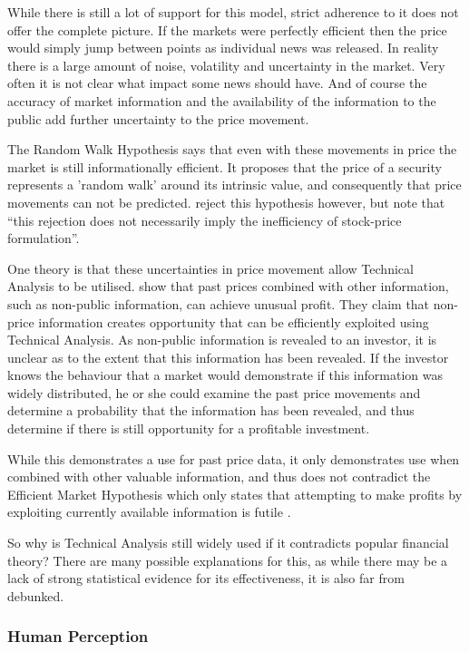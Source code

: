 \documentclass{article}
\theoremstyle{definition}
\begin{document}
While there is still a lot of support for this model, strict adherence to it does not offer the complete picture. If the markets were perfectly efficient then the price would simply jump between points as individual news was released. In reality there is a large amount of noise, volatility and uncertainty in the market. Very often it is not clear what impact some news should have. And of course the accuracy of market information and the availability of the information to the public add further uncertainty to the price movement.

The Random Walk Hypothesis says that even with these movements in price the market is still informationally efficient. It proposes that the price of a security represents a 'random walk' around its intrinsic value, and consequently that price movements can not be predicted. \cite{lo1988} reject this hypothesis however, but note that ``this rejection does not necessarily imply the inefficiency of stock-price formulation''.

One theory is that these uncertainties in price movement allow Technical Analysis to be utilised. \cite{indefenseof} show that past prices combined with other information, such as non-public information, can achieve unusual profit. They claim that non-price information creates opportunity that can be efficiently exploited using Technical Analysis. As non-public information is revealed to an investor, it is unclear as to the extent that this information has been revealed. If the investor knows the behaviour that a market would demonstrate if this information was widely distributed, he or she could examine the past price movements and determine a probability that the information has been revealed, and thus determine if there is still opportunity for a profitable investment.

While this demonstrates a use for past price data, it only demonstrates use when combined with other valuable information, and thus does not contradict the Efficient Market Hypothesis which only states that attempting to make profits by exploiting currently available information is futile \citep{taprofitability}.

So why is Technical Analysis still widely used if it contradicts popular financial theory? There are many possible explanations for this, as while there may be a lack of strong statistical evidence for its effectiveness, it is also far from debunked. 	

\subsubsection{Human Perception}
\end{document}

